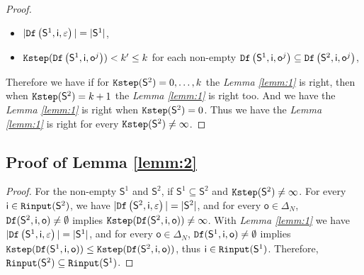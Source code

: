 \begin{appendices}
\begin{proof}
\begin{itemize}
 \item  $|{\tt Df}\left(\mathsf{S}^{1},\mathsf{i},\varepsilon\right)|=|\mathsf{S}^1|$,
 \item  ${\tt Kstep}({\tt Df}\left(\mathsf{S}^{1},\mathsf{i},\mathsf{o}^{j}\right))<k'\le k$ for each non-empty ${\tt Df}\left(\mathsf{S}^{1},\mathsf{i},\mathsf{o}^{j}\right)\subseteq {\tt Df}\left(\mathsf{S}^{2},\mathsf{i},\mathsf{o}^{j}\right)$,
 \end{itemize} 
 Therefore we have if for ${\tt Kstep}(\mathsf{S}^{2})=0,\ldots, k$ the {\em Lemma \ref{lemm:1}} is right, then when ${\tt Kstep}(\mathsf{S}^{2})=k+1$ the {\em Lemma \ref{lemm:1}} is right too. 
And we have the {\em Lemma \ref{lemm:1}} is right when ${\tt Kstep}(\mathsf{S}^{2})=0$. Thus we have the {\em Lemma \ref{lemm:1}} is right for every ${\tt Kstep}(\mathsf{S}^{2})\ne \infty$.
 
\end{proof}
\subsection{Proof of Lemma \ref{lemm:2}}
\begin{proof}
For the non-empty $\mathsf{S}^{1}$ and $\mathsf{S}^{2}$, if $\mathsf{S}^{1}\subseteq\mathsf{S}^{2}$ and ${\tt Kstep}(\mathsf{S}^{2})\ne\infty$.
For every $\mathsf{i}\in {\tt Rinput}(\mathsf{S}^2)$, we have  $|{\tt Df}\left(\mathsf{S}^2,\mathsf{i},\varepsilon\right)|=|\mathsf{S}^2|$, and 
for every $\mathsf{o} \in \Delta_N$, ${\tt Df}(\mathsf{S}^2,\mathsf{i},\mathsf{o})\ne \emptyset$ implies ${\tt Kstep}({\tt Df}(\mathsf{S}^2,\mathsf{i},\mathsf{o}))\ne \infty$. With {\em Lemma \ref{lemm:1}} we have $|{\tt Df}\left(\mathsf{S}^1,\mathsf{i},\varepsilon\right)|=|\mathsf{S}^1|$, and 
for every $\mathsf{o} \in \Delta_N$, ${\tt Df}(\mathsf{S}^1,\mathsf{i},\mathsf{o})\ne \emptyset$ implies ${\tt Kstep}({\tt Df}(\mathsf{S}^1,\mathsf{i},\mathsf{o}))\le {\tt Kstep}({\tt Df}(\mathsf{S}^2,\mathsf{i},\mathsf{o}))$, thus $\mathsf{i}\in {\tt Rinput}(\mathsf{S}^1)$. Therefore, ${\tt Rinput}(\mathsf{S}^2)\subseteq{\tt Rinput}(\mathsf{S}^1)$.
\end{proof}



\end{appendices}
